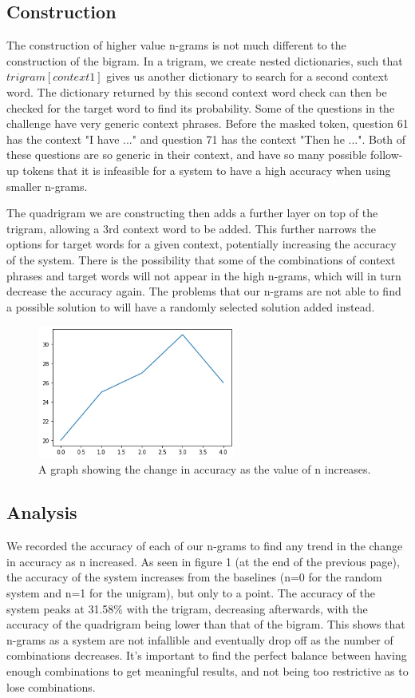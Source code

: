 \documentclass{article}
\begin{document}
\subsection{Construction}
The construction of higher value n-grams is not much different to the construction of the bigram. In a trigram, we create nested dictionaries, such that $trigram[context1]$ gives us another dictionary to search for a second context word. The dictionary returned by this second context word check can then be checked for the target word to find its probability. Some of the questions in the challenge have very generic context phrases. Before the masked token, question 61 has the context "I have ..." and question 71 has the context "Then he ...". Both of these questions are so generic in their context, and have so many possible follow-up tokens that it is infeasible for a system to have a high accuracy when using smaller n-grams.

The quadrigram we are constructing then adds a further layer on top of the trigram, allowing a 3rd context word to be added. This further narrows the options for target words for a given context, potentially increasing the accuracy of the system. There is the possibility that some of the combinations of context phrases and target words will not appear in the high n-grams, which will in turn decrease the accuracy again. The problems that our n-grams are not able to find a possible solution to will have a randomly selected solution added instead. 

\begin{figure}[h]
\includegraphics[width=6.5cm]{graph1.png}
\centering
\caption{A graph showing the change in accuracy as the value of n increases.}
\end{figure}

\subsection{Analysis}
We recorded the accuracy of each of our n-grams to find any trend in the change in accuracy as n increased. As seen in figure 1 (at the end of the previous page), the accuracy of the system increases from the baselines (n=0 for the random system and n=1 for the unigram), but only to a point. The accuracy of the system peaks at 31.58\% with the trigram, decreasing afterwards, with the accuracy of the quadrigram being lower than that of the bigram. This shows that n-grams as a system are not infallible and eventually drop off as the number of combinations decreases. It's important to find the perfect balance between having enough combinations to get meaningful results, and not being too restrictive as to lose combinations.
\end{document}
